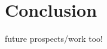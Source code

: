 \documentclass[11pt, a4paper]{report}
\begin{document}
\newcommand{\mycaption}[2]{\caption[#1]{\textbar\, \textbf{#1.} #2}}








\chapter*{Conclusion}
future prospects/work too!
\label{chap:conclusion}




\footnotesize{}
\end{document}
